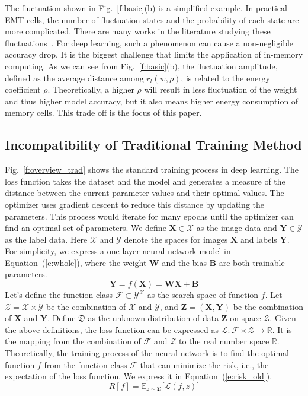 \documentclass[10pt,journal,compsoc]{IEEEtran}
\begin{document}
The fluctuation shown in Fig.~\ref{f:basic}(b) is a simplified example. In practical EMT cells, the number of fluctuation states and the probability of each state are more complicated. There are many works in the literature studying these fluctuations~\cite{gong2018signal}.
For deep learning, such a phenomenon can cause a non-negligible accuracy drop. It is the biggest challenge that limits the application of in-memory computing. As we can see from Fig.~\ref{f:basic}(b), the fluctuation amplitude, defined as the average distance among $r_l(w,\rho)$, is related to the energy coefficient $\rho$. Theoretically, a higher $\rho$ will result in less fluctuation of the weight and thus higher model accuracy, but it also means higher energy consumption of memory cells. This trade off is the focus of this paper.

\subsection{Incompatibility of Traditional Training Method}
\label{s:risk}

Fig.~\ref{f:overview_trad} shows the standard training process in deep learning. The loss function takes the dataset and the model and generates a measure of the distance between the current parameter values and their optimal values. The optimizer uses gradient descent to reduce this distance by updating the parameters. This process would iterate for many epochs until the optimizer can find an optimal set of parameters. We define $\mathbf{X}\in \mathcal{X} $ as the image data and $\mathbf{Y}\in \mathcal{Y} $ as the label data. Here $\mathcal{X}$ and $\mathcal{Y}$ denote the spaces for images $\mathbf{X}$ and labels $\mathbf{Y}$. For simplicity, we express a one-layer neural network model in Equation~(\ref{e:whole}), where the weight $\mathbf{W}$ and the bias $\mathbf{B}$ are both trainable parameters.
\begin{equation}
\mathbf{Y}  = f(\mathbf{X}) = \mathbf{W}\mathbf{X}+\mathbf{B} 
\label{e:whole}
\end{equation}
Let's define the function class $\mathcal{F}\subset \mathcal{Y}^\mathcal{X}$ as the search space of function $f$. Let $ \mathcal{Z} = \mathcal{X} \times \mathcal{Y}$ be the combination of $\mathcal{X}$ and $\mathcal{Y}$, and $\textbf{Z}=(\textbf{X},\textbf{Y})$ be the combination of $\textbf{X}$ and $\textbf{Y}$. Define $\mathfrak{D}$ as the unknown distribution of data $\textbf{Z}$ on space $\mathcal{Z}$. Given the above definitions, the loss function can be expressed as $\mathcal{L}:\mathcal{F} \times \mathcal{Z} \rightarrow \mathbb{R}$. It is the mapping from the combination of $\mathcal{F}$ and $\mathcal{Z}$ to the real number space $\mathbb{R}$. Theoretically, the training process of the neural network is to find the optimal function $f$ from the function class $\mathcal{F}$ that can minimize the risk, i.e., the expectation of the loss function. We express it in Equation~(\ref{e:risk_old}). 
\begin{equation}
R[{f}]=\mathbb{E}_{{z}\sim {\mathfrak{D}}}\big[\mathcal{L}({f},{z})\big]
\label{e:risk_old}
\end{equation}
\end{document}
